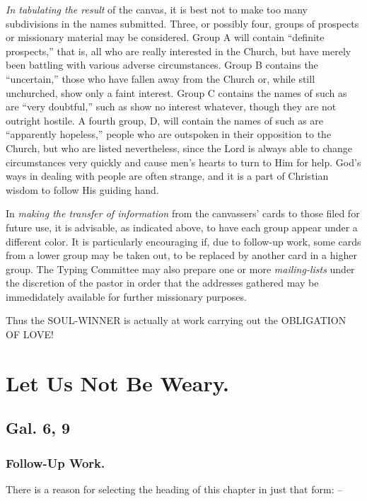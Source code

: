 \documentclass[
]{book}
\begin{document}
\emph{In tabulating the result} of the canvas, it is best not to make too many subdivisions in the names submitted. Three, or possibly four, groups of prospects or missionary material may be considered. Group A will contain ``definite prospects,'' that is, all who are really interested in the Church, but have merely been battling with various adverse circumstances. Group B contains the ``uncertain,'' those who have fallen away from the Church or, while still unchurched, show only a faint interest. Group C contains the names of such as are ``very doubtful,'' such as show no interest whatever, though they are not outright hostile. A fourth group, D, will contain the names of such as are ``apparently hopeless,'' people who are outspoken in their opposition to the Church, but who are listed nevertheless, since the Lord is always able to change circumstances very quickly and cause men's hearts to turn to Him for help. God's ways in dealing with people are often strange, and it is a part of Christian wisdom to follow His guiding hand.

In \emph{making the transfer of information} from the canvassers' cards to those filed for future use, it is advisable, as indicated above, to have each group appear under a different color. It is particularly encouraging if, due to follow-up work, some cards from a lower group may be taken out, to be replaced by another card in a higher group. The Typing Committee may also prepare one or more \emph{mailing-lists} under the discretion of the pastor in order that the addresses gathered may be immedidately available for further missionary purposes.

Thus the SOUL-WINNER is actually at work carrying out the OBLIGATION OF LOVE!

\chapter{Let Us Not Be Weary.}\label{let-us-not-be-weary.}

\section*{Gal. 6, 9}\label{gal.-6-9}

\subsection*{Follow-Up Work.}\label{follow-up-work.}

There is a reason for selecting the heading of this chapter in just that form: --
\end{document}
